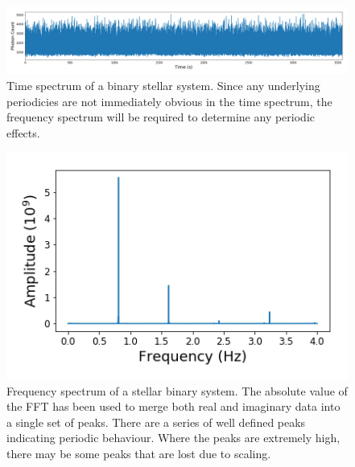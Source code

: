 \message{ !name(Assn2.tex)}\documentclass[twocolumn]{article}
\begin{document}
\begin{figure}
\centering
\includegraphics[width=\textwidth]{binary_time}
\caption{Time spectrum of a binary stellar system. Since any underlying periodicies are not immediately obvious in the time spectrum, the frequency spectrum will be required to determine any periodic effects.}
\label{fig:binary_time}
\end{figure}

\begin{figure}
\centering
\includegraphics[width=\textwidth]{BinarySpectrum}
\caption{Frequency spectrum of a stellar binary system. The absolute value of the FFT has been used to merge both real and imaginary data into a single set of peaks. There are a series of well defined peaks indicating periodic behaviour. Where the peaks are extremely high, there may be some peaks that are lost due to scaling.}
\label{fig:BinarySpectrum}
\end{figure}
\end{document}
